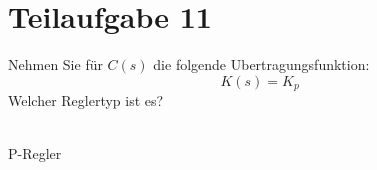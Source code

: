 \section{Teilaufgabe 11}
\begin{aufgabe}
    Nehmen Sie für $C(s)$ die folgende Ubertragungsfunktion: 
    \[ K(s) = K_p \]
    Welcher Reglertyp ist es?
\end{aufgabe}
\\
P-Regler
